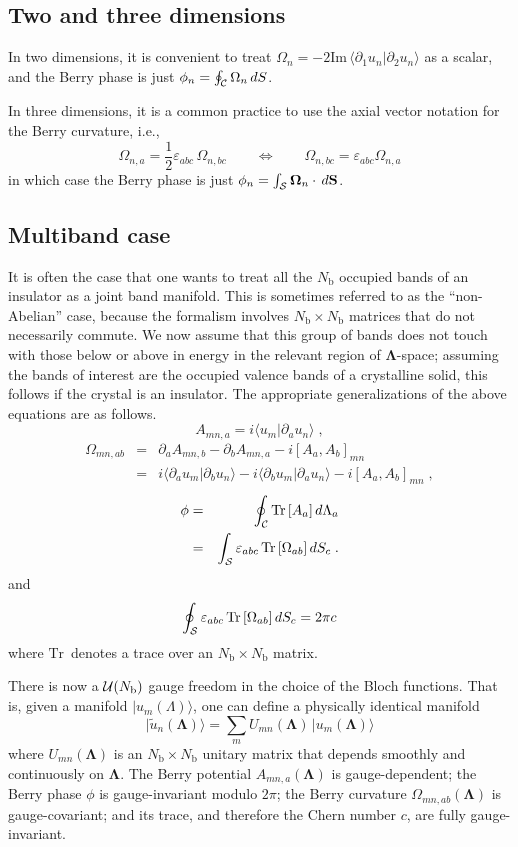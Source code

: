 \documentclass[11pt]{article}
\numberwithin{equation}{section} %
\def\nn{\nonumber\\}
\def\bea{\begin{eqnarray}}
\def\eea{\end{eqnarray}}
\def\beq{\begin{equation}}
\def\eeq{\end{equation}}
\renewcommand{\Im}{\textrm{Im}}
\def\ket#1{\vert #1 \rangle}
\def\ip#1#2{\langle #1 \vert #2 \rangle}
\def\O{{\Omega}}
\def\bO{\mathbf{\Omega}}
\def\pa{\partial_a}
\def\pb{\partial_b}
\def\L{\Lambda}
\def\bL{\mathbf{\Lambda}}
\def\Im{\textrm{Im}\,}
\def\Tr{\textrm{Tr}\,}
\def\cC{{\cal C}}
\def\cS{{\cal S}}
\def\ve{\varepsilon}
\def\Nb{N_\textrm{b}}
\def\half{\frac{\textstyle{1}}{\textstyle{2}}}
\begin{document}
\subsection{Two and three dimensions}

In two dimensions, it is convenient to treat $\O_n=-2\Im
\ip{\partial_1 u_n}{\partial_2 u_n}$ as a scalar, and the Berry
phase is just $\phi_n=\oint_\cC \O_n\,dS$.

In three dimensions, it is a common practice to use the axial vector
notation for the Berry curvature, i.e.,
%
\beq
\O_{n,a}= \half  \ve_{abc}\,\O_{n,bc} \qquad\Leftrightarrow\qquad
\O_{n,bc} = \ve_{abc} \O_{n,a}
\eeq
%
in which case the Berry phase is just
$\phi_n=\int_\cS \bO_n\cdot\,d\mathbf{S}$.

\subsection{Multiband case}

It is often the case that one wants to treat all the $\Nb$ occupied
bands of an insulator as a joint band manifold.  This is sometimes
referred to as the ``non-Abelian'' case, because the formalism
involves $\Nb\times\Nb$ matrices that do not necessarily commute.
We now assume that this group of bands does not touch with those
below or above in energy in the relevant region of $\bL$-space;
assuming the bands of interest are the occupied valence bands of
a crystalline solid, this follows if the crystal is an insulator.
The appropriate generalizations of the above equations are
as follows.
%
\beq
A_{mn,a}=i\ip{u_m}{\pa u_n} \;,
\eeq
%
\bea
\O_{mn,ab} &=& \pa A_{mn,b} - \pb A_{mn,a} -i[A_a,A_b]_{mn} \nn
   &=&  i\ip{\pa u_m}{\pb u_n}-i\ip{\pb u_m}{\pa u_n} -i[A_a,A_b]_{mn}\;,
\eea
%
\bea
\phi
&=&\oint_\cC \Tr[A_a]\,d\L_a \label{eq:bp}\\
&=& \int_\cS \ve_{abc}\,\Tr[\O_{ab}]\,dS_c \;.
\eea
%
and
%
\beq
\oint_\cS \ve_{abc}\,\Tr[\O_{ab}]\,dS_c=2\pi c
\eeq
%
where $\Tr$ denotes a trace over an $\Nb\times\Nb$ matrix.

There is now a ${\cal U}(\Nb)$ gauge freedom in the choice of the
Bloch functions.  That is, given a manifold
$\ket{u_m(\L)}$, one can define a physically identical manifold
%
\beq
\ket{\tilde{u}_n(\bL)}=\sum_m U_{mn}(\bL)\,\ket{u_m(\bL)}
\eeq
%
where $U_{mn}(\bL)$ is an $\Nb\times\Nb$ unitary matrix that
depends smoothly and continuously on $\bL$.
The Berry potential $A_{mn,a}(\bL)$ is gauge-dependent;
the Berry phase $\phi$ is gauge-invariant modulo $2\pi$;
the Berry curvature $\O_{mn,ab}(\bL)$ is gauge-covariant;
and its trace, and therefore the Chern number $c$, are fully
gauge-invariant.
\end{document}
